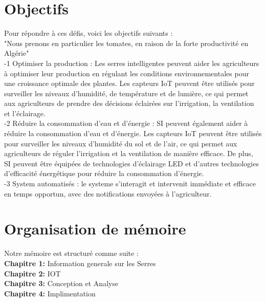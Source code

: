 \section*{Objectifs }
Pour répondre à ces défis, voici les objectifs suivants :
\\
"Nous prenons en particulier les tomates, en raison de la forte productivité en Algérie"
\\
-1 Optimiser la production : Les serres intelligentes peuvent aider les agriculteurs à optimiser leur production en régulant les conditions environnementales pour une croissance optimale des plantes. Les capteurs IoT peuvent être utilisés pour surveiller les niveaux d'humidité, de température et de lumière, ce qui permet aux agriculteurs de prendre des décisions éclairées sur l'irrigation, la ventilation et l'éclairage.
\\
-2 Réduire la consommation d'eau et d'énergie : SI peuvent également aider à réduire la consommation d'eau et d'énergie. Les capteurs IoT peuvent être utilisés pour surveiller les niveaux d'humidité du sol et de l'air, ce qui permet aux agriculteurs de réguler l'irrigation et la ventilation de manière efficace. De plus, SI peuvent être équipées de technologies d'éclairage LED et d'autres technologies d'efficacité énergétique pour réduire la consommation d'énergie.
\\
-3 System automatisés : le systeme s'interagit et intervenit immédiate et efficace en temps opportun, avec des notifications envoyées à l'agriculteur. 
\section*{Organisation de mémoire }
Notre mémoire est structuré comme suite : 
\\
\textbf{Chapitre 1: }
Information generale sur les Serres 
\\
\textbf{Chapitre 2: }
IOT
\\
\textbf{Chapitre 3: }
Conception et Analyse
\\
\textbf{Chapitre 4: }
Implimentation